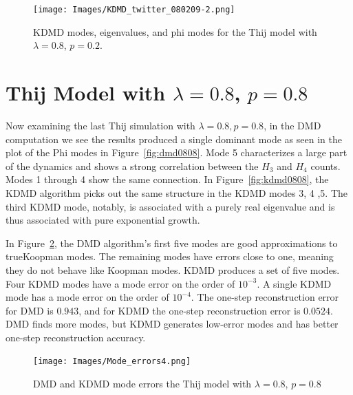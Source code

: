 \begin{figure}
    \texttt{[image: Images/KDMD\_twitter\_080209-2.png]}
    \centering
    \caption{KDMD modes, eigenvalues, and phi modes for the Thij model
    with $\lambda=0.8$, $p=0.2$. \label{fig:kdmd0802}}
\end{figure}

\FloatBarrier

\section{Thij Model with \texorpdfstring{$\lambda=0.8$, $p=0.8$}{l=0.8, p=0.8}}
Now examining the last Thij simulation with $\lambda=0.8, p=0.8$, in the DMD computation we see the results
 produced a single dominant mode as seen in the plot of the Phi modes in Figure~\ref{fig:dmd0808}.
  Mode 5 characterizes a large part of the dynamics
 and shows a strong correlation between the $H_{3}$ and $H_{4}$ counts. Modes 1 through 4 show the same connection. In Figure~\ref{fig:kdmd0808},
 the KDMD algorithm picks out the same structure in the KDMD modes 3, 4 ,5. The third KDMD mode, notably, is 
 associated with a purely real eigenvalue and is thus associated with pure exponential growth.  

In Figure~\ref{fig:0808modeerrors}, the DMD algorithm's first five modes are good approximations to trueKoopman modes.
 The remaining modes have errors close
to one, meaning they do not behave like Koopman modes. KDMD produces a set of five modes. Four KDMD modes 
have a mode error on the order of $10^{-3}$. A single KDMD mode has a mode error on the order of $10^{-4}$.
 The one-step reconstruction error for DMD is $0.943$,
 and for KDMD the one-step reconstruction error is $0.0524$. DMD finds more modes, but KDMD 
 generates low-error modes and has better one-step reconstruction accuracy.

\begin{figure}
    \texttt{[image: Images/Mode\_errors4.png]}
    \centering
    \caption{DMD and KDMD mode errors the Thij model with $\lambda=0.8$, $p=0.8$ \label{fig:0808modeerrors}}
\end{figure}



